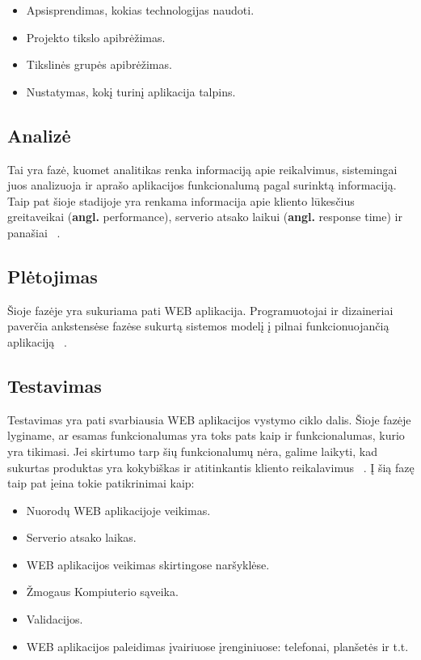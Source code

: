 \documentclass[a4paper,12pt,fleqn]{article}
\begin{document}
\begin{itemize}
    \item Apsisprendimas, kokias technologijas naudoti.
    \item Projekto tikslo apibrėžimas.
    \item Tikslinės grupės apibrėžimas.
    \item Nustatymas, kokį turinį aplikacija talpins.
\end{itemize}

\subsection{Analizė}
Tai yra fazė, kuomet analitikas renka informaciją apie reikalvimus, sistemingai juos analizuoja ir aprašo aplikacijos funkcionalumą pagal surinktą informaciją. Taip pat šioje stadijoje yra renkama informacija apie kliento lūkesčius greitaveikai (\textbf{angl.} performance), serverio atsako laikui (\textbf{angl.} response time) ir panašiai ~\cite{french1970web}.

\subsection{Plėtojimas}
Šioje fazėje yra sukuriama pati WEB aplikacija. Programuotojai ir dizaineriai paverčia ankstensėse fazėse sukurtą sistemos modelį į pilnai funkcionuojančią aplikaciją ~\cite{french1970web}.

\subsection{Testavimas}
Testavimas yra pati svarbiausia WEB aplikacijos vystymo ciklo dalis. Šioje fazėje lyginame, ar esamas funkcionalumas yra toks pats kaip ir funkcionalumas, kurio yra tikimasi. Jei skirtumo tarp šių funkcionalumų nėra, galime laikyti, kad sukurtas produktas yra kokybiškas ir atitinkantis kliento reikalavimus ~\cite{french1970web}. Į šią fazę taip pat įeina tokie patikrinimai kaip:

\begin{itemize}
    \item Nuorodų WEB aplikacijoje veikimas.
    \item Serverio atsako laikas. 
    \item WEB aplikacijos veikimas skirtingose naršyklėse.
    \item Žmogaus Kompiuterio sąveika.
    \item Validacijos.
    \item WEB aplikacijos paleidimas įvairiuose įrenginiuose: telefonai, planšetės ir t.t.
\end{itemize}
\end{document}
